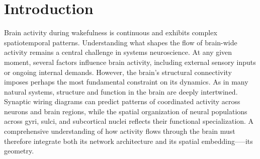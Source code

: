 \documentclass{article}
\begin{document}
\hrulefill
\vspace{10 pt}


\section*{Introduction}

Brain activity during wakefulness is continuous and exhibits complex spatiotemporal patterns. Understanding what shapes the flow of brain-wide activity remains a central challenge in systems neuroscience. At any given moment, several factors influence brain activity, including external sensory inputs or ongoing internal demands\cite{flavell2022emergence}. However, the brain’s structural connectivity imposes perhaps the most fundamental constraint on its dynamics\cite{suarez2020linking}. As in many natural systems, structure and function in the brain are deeply intertwined. Synaptic wiring diagrams can predict patterns of coordinated activity across neurons\cite{uzel2022set, randi2023neural, lappalainen2024connectome} and brain regions\cite{legare2024structural}, while the spatial organization of neural populations across gyri, sulci, and subcortical nuclei reflects their functional specialization. A comprehensive understanding of how activity flows through the brain must therefore integrate both its network architecture and its spatial embedding—--its geometry.
\end{document}
